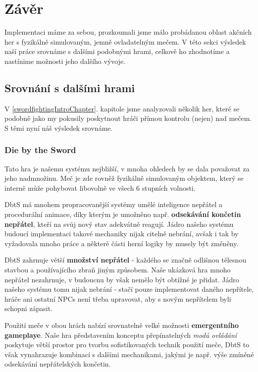 \chapter{Závěr}

Implementaci máme za sebou, prozkoumali jsme málo probádanou oblast akčních her s fyzikálně simulovaným, jemně ovladatelným mečem. V této sekci výsledek naší práce srovnáme s dalšími podobnými hrami, celkově ho zhodnotíme a nastínime možnosti jeho dalšího vývoje. 

\section{Srovnání s dalšími hrami}

V \ref{swordfightingIntroChapter}. kapitole jsme analyzovali několik her, které se podobně jako my pokusily poskytnout hráči přímou kontrolu (nejen) nad mečem. S těmi nyní náš výsledek srovnáme.

\subsection{Die by the Sword}

Tato hra je našemu systému nejbližší, v mnoha ohledech by se dala považovat za jeho nadmnožinu. Meč je zde rovněž fyzikálně simulovaným objektem, který se interně může pohybovat libovolně ve všech 6 stupních volnosti. 

\acl{DbtS} má mnohem propracovanější systémy umělé inteligence nepřátel a procedurální animace, díky kterým je umožněno např. \textbf{odsekávání končetin nepřátel}, kteří na svůj nový stav adekvátně reagují. Jádro našeho systému budoucí implementaci takové mechaniky nijak citelně nebrání, avšak i tak by vyžadovala mnoho práce a některé části herní logiky by musely být změněny. 

\acl{DbtS} zahrnuje větší \textbf{množství nepřátel} - každého se značně odlišnou tělesnou stavbou a používajícího zbraň jiným způsobem. Naše ukázková hra mnoho nepřátel nezahrnuje, v budoucnu by však nemělo být obtížné je přidat. Jádro našeho systému tomu nijak nebrání - stačí pouze implementovat daného nepřítele, hráče ani ostatní \acs{NPC}s není třeba upravovat, aby s novým nepřítelem byli schopni zápasit.  

Použití meče v obou hrách nabízí srovnatelně velké možnosti \textbf{emergentního gameplaye}. Naše hra představením konceptu přepínatelných \textit{modů ovládání} poskytuje větší prostor pro tvorbu sofistikovaných technik použití meče, \acl{DbtS} to však vynahrazuje kombinací s dalšími mechanikami, jakými je např. výše zmíněné odsekávání nepřátelských končetin. 

